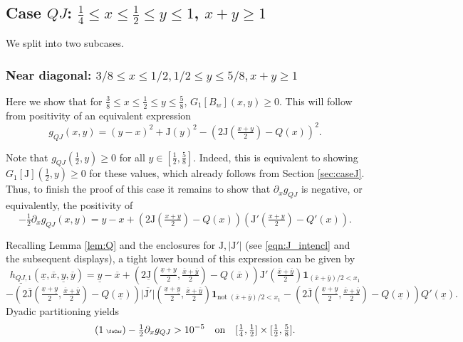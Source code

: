 \documentclass[11pt]{amsart}
\theoremstyle{plain}
\newcommand{\auto}{\tag{\addtocounter{equation}{1}\theequation\;{\tiny\faCar}}}
\theoremstyle{definition}
\theoremstyle{remark}
\numberwithin{equation}{section}
\begin{document}
\subsection{\texorpdfstring{Case $QJ$: $\frac14\le x\le \frac12\le y\le 1$, $x+y\ge 1$}{Case QJ}}
\label{sec:caseQJ}
We split into two subcases.

\subsubsection{Near diagonal: $3/8\leq x\leq 1/2, 1/2\leq y\leq 5/8, x+y\geq 1$}
\label{sec:QJ-I}
Here we show that for $\frac38\le x\le \frac12\le y\le \frac58$,
$G_1[B_w](x,y)\ge 0$.
This will follow from positivity of an equivalent expression
\[ g_{QJ}(x,y)=(y-x)^{2} + {\mathrm{J}}(y)^2- (2 {\mathrm{J}}(\tfrac{x+y}{2})-Q(x))^2. \]

Note
that
$g_{QJ}(\tfrac12, y)\ge 0$
for all $y\in [\tfrac12,\tfrac58]$.
Indeed, this is equivalent to showing $G_1[{\mathrm{J}}](\frac12,y)\ge 0$ for these values, which already follows from Section \ref{sec:caseJ}.
Thus, to finish the proof of this case it remains to show that $\partial_x g_{QJ}$ is negative, or equivalently, the positivity of
\[ -\tfrac{1}{2}\partial_x g_{QJ}(x,y) = y-x+(2{\mathrm{J}}(\tfrac{x+y}{2})-Q(x)) ({\mathrm{J}}'(\tfrac{x+y}{2})-Q'(x)).\]

Recalling Lemma \ref{lem:Q} and the enclosures for ${\mathrm{J}}, |{\mathrm{J}}'|$ (see \eqref{eqn:J_intencl} and the subsequent displays), a tight lower bound of this expression can be given by
\[ \underline{h_{QJ,1}}(\underline{x},\overline{x},\underline{y},\overline{y})
=\underline{y}-\overline{x}+(2\underline{{\mathrm{J}}}(\tfrac{\underline{x}+\underline{y}}2,\tfrac{\overline{x}+\overline{y}}2)-Q(\overline{x})) {\mathrm{J}}'(\tfrac{\overline{x}+\overline{y}}2)\mathbf{1}_{(\overline{x}+\overline{y})/2<x_1}
\]
\[ - (2\overline{{\mathrm{J}}}(\tfrac{\underline{x}+\underline{y}}2,\tfrac{\overline{x}+\overline{y}}2)-Q(\underline{x})) \overline{|{\mathrm{J}}'|}(\tfrac{\underline{x}+\underline{y}}2,\tfrac{\overline{x}+\overline{y}}2)\mathbf{1}_{\text{not}\;(\overline{x}+\overline{y})/2<x_1}
- (2\overline{{\mathrm{J}}}(\tfrac{\underline{x}+\underline{y}}2,\tfrac{\overline{x}+\overline{y}}2)-Q(\underline{x}))Q'(\underline{x}). \]
Dyadic partitioning yields
\begin{equation}\label{eqn:h_QJ_1_auto}\auto
-\tfrac{1}{2}\partial_x g_{QJ} > 10^{-5}\quad\text{on}\quad[\tfrac14,\tfrac12]\times [\tfrac12,\tfrac58].
\end{equation}
\end{document}
